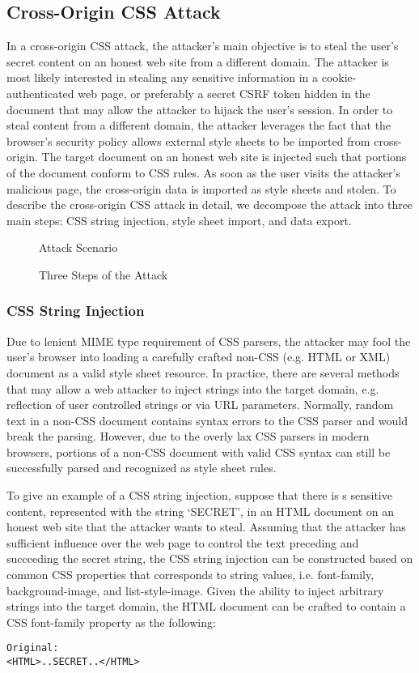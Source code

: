 \documentclass{acm_proc_article-sp}
\begin{document}
{\subsection{Cross-Origin CSS Attack}
In a cross-origin CSS attack, the attacker's main objective is to steal the user's secret content on an honest web site from a different domain. The attacker is most likely interested in stealing any sensitive information in a cookie-authenticated web page, or preferably a secret CSRF token\cite{csrf} hidden in the document that may allow the attacker to hijack the user's session. In order to steal content from a different domain, the attacker leverages the fact that the browser's security policy allows external style sheets to be imported from cross-origin. The target document on an honest web site is injected such that portions of the document conform to CSS rules. As soon as the user visits the attacker's malicious page, the cross-origin data is imported as style sheets and stolen. To describe the cross-origin CSS attack in detail, we decompose the attack into three main steps: CSS string injection, style sheet import, and data export.

\begin{figure}
\centering
{}
\caption{Attack Scenario}
\end{figure}

\begin{figure}
\centering
{}
\caption{Three Steps of the Attack}
\end{figure}

\subsubsection{CSS String Injection}
Due to lenient MIME type requirement of CSS parsers, the attacker may fool the user's browser into loading a carefully crafted non-CSS (e.g. HTML or XML) document as a valid style sheet resource. In practice, there are several methods that may allow a web attacker to inject strings into the target domain, e.g. reflection of user controlled strings or via URL parameters. Normally, random text in a non-CSS document contains syntax errors to the CSS parser and would break the parsing. However, due to the overly lax CSS parsers in modern browsers, portions of a non-CSS document with valid CSS syntax can still be successfully parsed and recognized as style sheet rules.

To give an example of a CSS string injection, suppose that there is s sensitive content, represented with the string `SECRET', in an HTML document on an honest web site that the attacker wants to steal. Assuming that the attacker has sufficient influence over the web page to control the text preceding and succeeding the secret string, the CSS string injection can be constructed based on common CSS properties that corresponds to string values, i.e. font-family, background-image, and list-style-image. Given the ability to inject arbitrary strings into the target domain, the HTML document can be crafted to contain a CSS font-family property as the following:
\begin{verbatim}
Original:
<HTML>..SECRET..</HTML>


\end{verbatim}}
\end{document}
